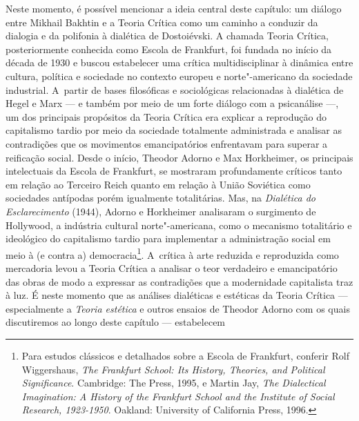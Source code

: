 Neste momento, é possível mencionar a ideia central deste capítulo: um
diálogo entre Mikhail Bakhtin e a Teoria Crítica como um caminho a
conduzir da dialogia e da polifonia à dialética de Dostoiévski. A
chamada Teoria Crítica, posteriormente conhecida como Escola de
Frankfurt, foi fundada no início da década de 1930 e buscou estabelecer
uma crítica multidisciplinar à dinâmica entre cultura, política e sociedade no contexto europeu e norte"-americano da sociedade industrial.
A~partir de bases filosóficas e sociológicas relacionadas à dialética de Hegel e Marx --- e também por meio de um forte diálogo com a psicanálise
---, um dos principais propósitos da Teoria Crítica era explicar a
reprodução do capitalismo tardio por meio da sociedade totalmente
administrada e analisar as contradições que os movimentos emancipatórios
enfrentavam para superar a reificação social. Desde o início, Theodor
Adorno e Max Horkheimer, os principais intelectuais da Escola de
Frankfurt, se mostraram profundamente críticos tanto em relação ao
Terceiro Reich quanto em relação à União Soviética como sociedades
antípodas porém igualmente totalitárias. Mas, na \emph{Dialética do
Esclarecimento} (1944), Adorno e Horkheimer analisaram o surgimento de
Hollywood, a indústria cultural norte"-americana, como o mecanismo
totalitário e ideológico do capitalismo tardio para implementar a
administração social em meio à (e contra a) democracia\footnote{
  Para estudos clássicos e detalhados sobre a Escola de Frankfurt,
  conferir Rolf Wiggershaus, \emph{The Frankfurt School: Its
  History, Theories, and Political Significance}. Cambridge: The 
  Press, 1995, e Martin Jay, \emph{The Dialectical Imagination: A
  History of the Frankfurt School and the Institute of Social Research,
  1923-1950}. Oakland: University of California Press, 1996.}\label{para-estudos-cluxe1ssicos-e-detalhados-sobre-a-escola-de-frankfurt-conferir-rolf-wiggershaus-the-frankfurt-school-its-history-theories-and-political-significance.-cambridge-the-mit-press-1995-e-martin-jay-the-dialectical-imagination-a-history-of-the-frankfurt-school-and-the-institute-of-social-research-1923-1950.-oakland-university-of-california-press-1996.}.
A~crítica à arte reduzida e reproduzida como mercadoria levou a Teoria
Crítica a analisar o teor verdadeiro e emancipatório das obras de modo a
expressar as contradições que a modernidade capitalista traz à luz. É
neste momento que as análises dialéticas e estéticas da Teoria Crítica
--- especialmente a \emph{Teoria estética} e outros ensaios de Theodor
Adorno com os quais discutiremos ao longo deste capítulo --- estabelecem
